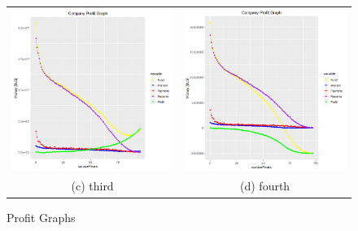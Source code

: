 \documentclass[12pt]{article}
\begin{document}
\begin{figure}[h]
\begin{tabular}{cc}
		\includegraphics[width=65mm]{profit2.PNG} &   \includegraphics[width=65mm]{profit3.PNG} \\
		(c) third & (d) fourth \\[6pt]

	\end{tabular}
	\caption{Profit Graphs}
\end{figure}
\end{document}

